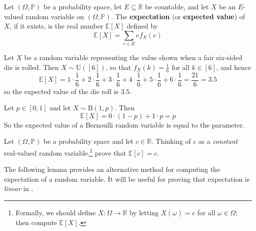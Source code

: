 \begin{definition}
\label{defExpectation}
Let $(\Omega,\mathbb{P})$ be a probability space, let $E \subseteq \mathbb{R}$ be countable, and let $X$ be an $E$-valued random variable on $(\Omega,\mathbb{P})$. The \textbf{expectation} (or \textbf{expected value}) of $X$, if it exists, is the real number $\mathbb{E}[X]$  defined by
\[ \mathbb{E}[X] = \sum_{e \in E} e f_X(e) \]
\end{definition}

\begin{example}
\label{exExpectationFairDieRoll}
Let $X$ be a random variable representing the value shown when a fair six-sided die is rolled. Then $X \sim \mathrm{U}([6])$, so that $f_X(k)=\frac{1}{6}$ for all $k \in [6]$, and hence
\[ \mathbb{E}[X] = 1 \cdot \frac{1}{6} + 2 \cdot \frac{1}{6} + 3 \cdot \frac{1}{6} + 4 \cdot \frac{1}{6} + 5 \cdot \frac{1}{6} + 6 \cdot \frac{1}{6} = \frac{21}{6} = 3.5 \]
so the expected value of the die roll is $3.5$.
\end{example}

\begin{example}
\label{exExpectationOfBernoulli}
Let $p \in [0,1]$ and let $X \sim \mathrm{B}(1,p)$. Then
\[ \mathbb{E}[X] = 0 \cdot (1-p) + 1 \cdot p = p \]
So the expected value of a Bernoulli random variable is equal to the parameter.
\end{example}

\begin{exercise}
Let $(\Omega,\mathbb{P})$ be a probability space and let $c \in \mathbb{R}$. Thinking of $c$ as a \textit{constant} real-valued random variable,\footnote{Formally, we should define $X : \Omega \to \mathbb{R}$ by letting $X(\omega)=c$ for all $\omega \in \Omega$; then compute $\mathbb{E}[X]$.} prove that $\mathbb{E}[c]=c$.
\end{exercise}

The following lemma provides an alternative method for computing the expectation of a random variable. It will be useful for proving that expectation is \textit{linear} in .

